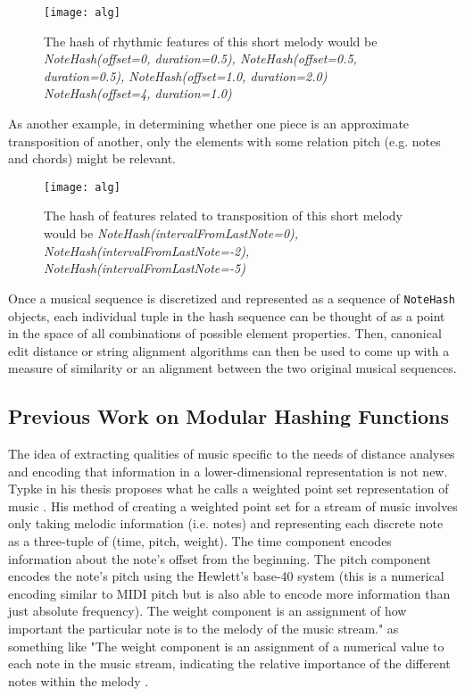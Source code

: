 \begin{figure}[H]
\centering
\texttt{[image: alg]}
\caption[Rhythmic hash of a short melody]{
The hash of rhythmic features of this short melody would be \textit{NoteHash(offset=0, duration=0.5), NoteHash(offset=0.5, duration=0.5), NoteHash(offset=1.0, duration=2.0) NoteHash(offset=4, duration=1.0)}}
\end{figure}

As another example, in determining whether one piece is an approximate transposition of another, only the elements with some relation pitch (e.g. notes and chords) might be relevant.

\begin{figure}[H]
\centering
\texttt{[image: alg]}
\caption[Melody transposition hash]{The hash of features related to transposition of this short melody would be \textit{NoteHash(intervalFromLastNote=0), NoteHash(intervalFromLastNote=-2), NoteHash(intervalFromLastNote=-5)}}
\end{figure}
Once a musical sequence is discretized and represented as a sequence of \texttt{NoteHash} objects, each individual tuple in the hash sequence can be thought of as a point in the space of all combinations of possible element properties. Then, canonical edit distance or string alignment algorithms can then be used to come up with a measure of similarity or an alignment between the two original musical sequences.

\subsection{Previous Work on Modular Hashing Functions}
The idea of extracting qualities of music specific to the needs of distance analyses and encoding that information in a lower-dimensional representation is not new. Typke in his thesis proposes what he calls a weighted point set representation of music \cite{typke}. His method of creating a weighted point set for a stream of music involves only taking melodic information (i.e. notes) and representing each discrete note as a three-tuple of (time, pitch, weight). The time component encodes information about the note's offset from the beginning. The pitch component encodes the note's pitch using the Hewlett's base-40 system (this is a numerical encoding similar to MIDI pitch but is also able to encode more information than just absolute frequency). The weight component is an assignment of how important the particular note is to the melody of the music stream." as something like "The weight component is an assignment of a numerical value to each note in the music stream, indicating the relative importance of the different notes within the melody \cite{hewlett}. 

